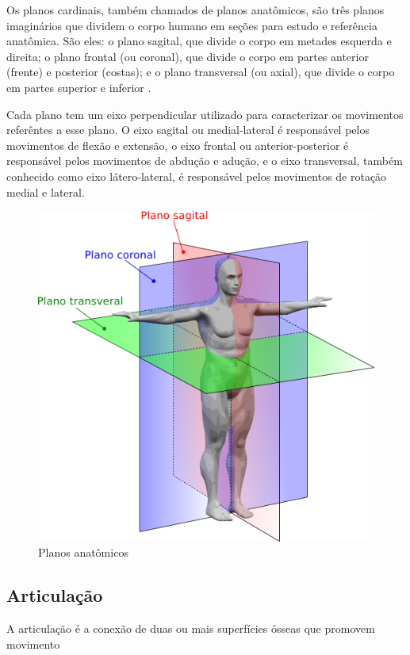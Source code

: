Os planos cardinais, também chamados de planos anatômicos, são três planos imaginários que dividem o corpo humano em seções para estudo e referência anatômica. São eles: o plano sagital, que divide o corpo em metades esquerda e direita; o plano frontal (ou coronal), que divide o corpo em partes anterior (frente) e posterior (costas); e o plano transversal (ou axial), que divide o corpo em partes superior e inferior \cite{cinesiologia}.

Cada plano tem um eixo perpendicular utilizado para caracterizar os movimentos referêntes a esse plano. O eixo sagital ou medial-lateral é responsável pelos movimentos de flexão e extensão, o eixo frontal ou anterior-posterior é responsável pelos movimentos de abdução e adução, e o eixo transversal, também conhecido como eixo látero-lateral, é responsável pelos movimentos de rotação medial e lateral\cite{cinesiologia}.


\begin{figure}[!htb]
	\centering
	\includegraphics[scale=0.55]{figuras/TAF/planos.png}
	\caption{Planos anatômicos}
	\label{fig:Planos anatomicos}
\end{figure}


\subsection[Articulação]{Articulação}
A articulação é a conexão de duas ou mais superfícies ósseas que promovem movimento \cite{articulacao}


